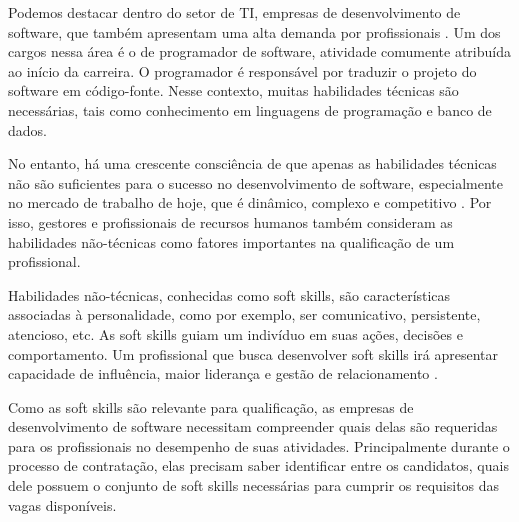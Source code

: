 
Podemos destacar dentro do setor de TI, empresas de desenvolvimento de software, que também apresentam uma alta demanda por profissionais \cite{kennan:09}. Um dos cargos nessa área é o de programador de software, atividade comumente atribuída ao início da carreira. O programador é responsável por traduzir o projeto do software em código-fonte. Nesse contexto, muitas habilidades técnicas são necessárias, tais como conhecimento em linguagens de programação e banco de dados.

No entanto, há uma crescente consciência de que apenas as habilidades técnicas não são suficientes para o sucesso no desenvolvimento de software, especialmente no mercado de trabalho de hoje, que é dinâmico, complexo e competitivo \cite{joseph:10}. Por isso, gestores e profissionais de recursos humanos também consideram as habilidades não-técnicas como fatores importantes na qualificação de um profissional.

Habilidades não-técnicas, conhecidas como soft skills, são características associadas à personalidade, como por exemplo, ser comunicativo, persistente, atencioso, etc. As soft skills guiam um indivíduo em suas ações, decisões e comportamento. Um profissional que busca desenvolver soft skills irá apresentar capacidade de influência, maior liderança e gestão de relacionamento \cite{hjyunus:12}.

Como as soft skills são relevante para qualificação, as empresas de desenvolvimento de software necessitam compreender quais delas são requeridas para os profissionais no desempenho de suas atividades. Principalmente durante o processo de contratação, elas precisam saber identificar entre os candidatos, quais dele possuem o conjunto de soft skills necessárias para cumprir os requisitos das vagas disponíveis.

